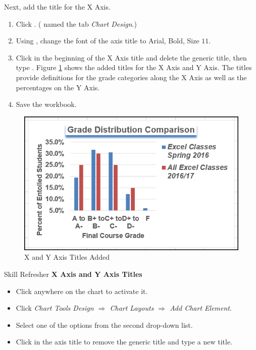 Next, add the title for the X Axis.

\begin{enumerate}
	\item Click . ( named the tab \textit{Chart Design}.)
	\item Using , change the font of the axis title to Arial, Bold, Size $ 11 $. 
	\item Click in the beginning of the X Axis title and delete the generic title, then type . Figure \ref{04:fig36} shows the added titles for the X Axis and Y Axis. The titles provide definitions for the grade categories along the X Axis as well as the percentages on the Y Axis.
	\item Save the  workbook.
\end{enumerate}

\begin{figure}[H]
	\centering
	\includegraphics[width=\maxwidth{.95\linewidth}]{gfx/ch04_fig36}
	\caption{X and Y Axis Titles Added}
	\label{04:fig36}
\end{figure}

\begin{center}
	\begin{sklbox}{Skill Refresher}
		\textbf{X Axis and Y Axis Titles}
		\\
		\begin{itemize}
			\setlength{\itemsep}{0pt}
			\setlength{\parskip}{0pt}
			\setlength{\parsep}{0pt}

			\item Click anywhere on the chart to activate it.
			\item Click \textit{Chart Tools Design $ \Rightarrow $ Chart Layouts $ \Rightarrow $ Add Chart Element}.
			\item Select one of the options from the second drop-down list.
			\item Click in the axis title to remove the generic title and type a new title.
			
		\end{itemize}
	\end{sklbox}
\end{center}


